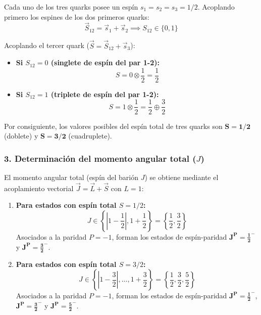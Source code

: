 \begin{problema}
Cada uno de los tres quarks posee un espín $s_1 = s_2 = s_3 = 1/2$. Acoplando primero los espines de los dos primeros quarks:
\begin{equation*}
\vec{S}_{12} = \vec{s}_1 + \vec{s}_2 \implies S_{12} \in \{0, 1\}
\end{equation*}

Acoplando el tercer quark ($\vec{S} = \vec{S}_{12} + \vec{s}_3$):
\begin{itemize}
    \item \textbf{Si $S_{12} = 0$ (singlete de espín del par 1-2):}
    \begin{equation*}
    S = 0 \otimes \frac{1}{2} = \frac{1}{2}
    \end{equation*}
    \item \textbf{Si $S_{12} = 1$ (triplete de espín del par 1-2):}
    \begin{equation*}
    S = 1 \otimes \frac{1}{2} = \frac{1}{2} \oplus \frac{3}{2}
    \end{equation*}
\end{itemize}

Por consiguiente, los valores posibles del espín total de tres quarks son $\mathbf{S = 1/2}$ (doblete) y $\mathbf{S = 3/2}$ (cuadruplete).

\subsubsection*{3. Determinación del momento angular total ($J$)}

El momento angular total (espín del barión $J$) se obtiene mediante el acoplamiento vectorial $\vec{J} = \vec{L} + \vec{S}$ con $L = 1$:

\begin{enumerate}[label=\alph*)]
    \item \textbf{Para estados con espín total $S = 1/2$:}
    \begin{equation*}
    J \in \left\{ \left| 1 - \frac{1}{2} \right|, 1 + \frac{1}{2} \right\} = \left\{ \frac{1}{2}, \frac{3}{2} \right\}
    \end{equation*}
    Asociados a la paridad $P = -1$, forman los estados de espín-paridad $\mathbf{J^P = \frac{1}{2}^-}$ y $\mathbf{J^P = \frac{3}{2}^-}$.

    \item \textbf{Para estados con espín total $S = 3/2$:}
    \begin{equation*}
    J \in \left\{ \left| 1 - \frac{3}{2} \right|, \dots, 1 + \frac{3}{2} \right\} = \left\{ \frac{1}{2}, \frac{3}{2}, \frac{5}{2} \right\}
    \end{equation*}
    Asociados a la paridad $P = -1$, forman los estados de espín-paridad $\mathbf{J^P = \frac{1}{2}^-}$, $\mathbf{J^P = \frac{3}{2}^-}$ y $\mathbf{J^P = \frac{5}{2}^-}$.
\end{enumerate}


\end{problema}
